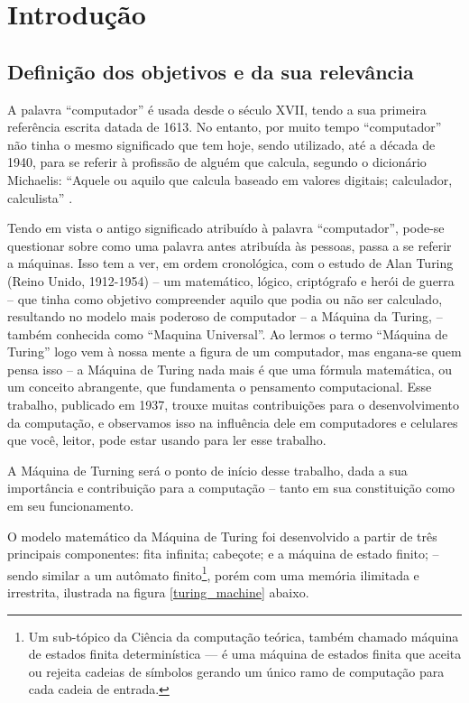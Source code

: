 \section{Introdução} 
\label{introduction}
\subsection{Definição dos objetivos e da sua relevância}
A palavra ``computador'' é usada desde o século XVII, tendo a sua primeira referência escrita datada de 1613. No entanto, por muito tempo ``computador'' não tinha o mesmo significado que tem hoje, sendo utilizado, até a década de 1940, para se referir à profissão de alguém que calcula, segundo o dicionário Michaelis: ``Aquele ou aquilo que calcula baseado em valores digitais; calculador, calculista'' \cite{4}.

Tendo em vista o antigo significado atribuído à palavra ``computador'', pode-se questionar sobre como uma palavra antes atribuída às pessoas, passa a se referir a máquinas. Isso tem a ver, em ordem cronológica, com o estudo de Alan Turing (Reino Unido, 1912-1954) – um matemático, lógico, criptógrafo e herói de guerra – que tinha como objetivo compreender aquilo que podia ou não ser calculado, resultando no modelo mais poderoso de computador – a Máquina da Turing, – também conhecida como ``Maquina Universal''. Ao lermos o termo ``Máquina de Turing'' logo vem à nossa mente a figura de um computador, mas engana-se quem pensa isso – a Máquina de Turing nada mais é que uma fórmula matemática, ou um conceito abrangente, que fundamenta o pensamento computacional. Esse trabalho, publicado em 1937, trouxe muitas contribuições para o desenvolvimento da computação, e observamos isso na influência dele em computadores e celulares que você, leitor, pode estar usando para ler esse  trabalho.  

A Máquina de Turning será o ponto de início desse trabalho, dada a sua importância e contribuição para a computação – tanto em sua constituição como em seu funcionamento. 

O modelo matemático da Máquina de Turing foi desenvolvido a partir de três principais componentes: fita infinita; cabeçote; e a máquina de estado finito; – sendo similar a um autômato finito\footnote{Um sub-tópico da Ciência da computação teórica, também chamado máquina de estados finita determinística — é uma máquina de estados finita que aceita ou rejeita cadeias de símbolos gerando um único ramo de computação para cada cadeia de entrada.}, porém com uma memória ilimitada e irrestrita, ilustrada na figura \ref{turing_machine} abaixo.

